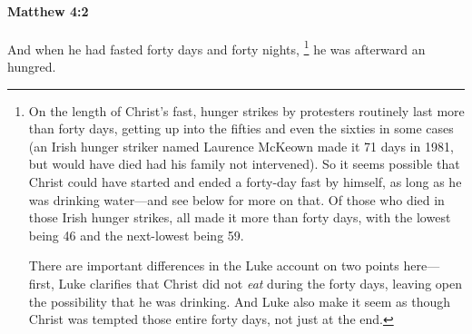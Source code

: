 		\paragraph{Matthew 4:2} %
			\label{MATTHEW-4-2}

			And when he had fasted forty days and forty nights,%
				\footnote{%
					On the length of Christ's fast, hunger strikes by protesters routinely last more than forty days, getting up into the fifties and even the sixties in some cases (an Irish hunger striker named Laurence McKeown made it 71 days in 1981, but would have died had his family not intervened). So it seems possible that Christ could have started and ended a forty-day fast by himself, as long as he was drinking water---and see below for more on that. Of those who died in those Irish hunger strikes, all made it more than forty days, with the lowest being 46 and the next-lowest being 59.
				
					There are important differences in the Luke account on two points here---first, Luke clarifies that Christ did not \textit{eat} during the forty days, leaving open the possibility that he was drinking. And Luke also make it seem as though Christ was tempted those entire forty days, not just at the end.
					}
			he was afterward an hungred.

			\begin{framed}
			\scriptsize
				\begin{compactdesc}
					\item[SBLG] 
				\end{compactdesc}
			\end{framed}


